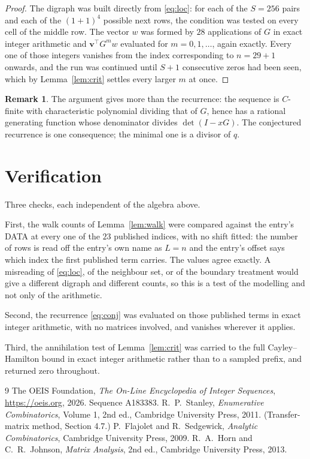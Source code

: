 \documentclass[11pt,a4paper]{article}
\theoremstyle{plain}
\theoremstyle{definition}
\newtheorem{remark}[theorem]{Remark}
\begin{document}
\begin{proof}
The digraph was built directly from \eqref{eq:loc}: for each of the $S=256$ pairs and each
of the $(1+1)^{4}$ possible next rows, the condition was tested on every cell of
the middle row. The vector $w$ was formed by $28$ applications of $G$ in exact integer
arithmetic and $\mathbf{v}^{\!\top}G^{m}w$ evaluated for $m=0,1,\dots$, again exactly.
Every one of those integers vanishes from the index corresponding to $n=29+1$ onwards,
and the run was continued until $S+1$ consecutive zeros had been seen, which by
Lemma~\ref{lem:crit} settles every larger $m$ at once.
\end{proof}

\begin{remark}
The argument gives more than the recurrence: the sequence is $C$-finite with characteristic
polynomial dividing that of $G$, hence has a rational generating function whose denominator
divides $\det(I-xG)$. The conjectured recurrence is one consequence; the minimal one is a
divisor of $q$.
\end{remark}

\section{Verification}

Three checks, each independent of the algebra above.

First, the walk counts of Lemma~\ref{lem:walk} were compared against the entry's DATA at
every one of the $23$ published indices, with no shift fitted: the number of rows is
read off the entry's own name as $L=n$ and the entry's offset says which index the first
published term carries. The values agree exactly. A misreading of \eqref{eq:loc}, of the
neighbour set, or of the boundary treatment would give a different digraph and different
counts, so this is a test of the modelling and not only of the arithmetic.

Second, the recurrence \eqref{eq:conj} was evaluated on those published terms in exact
integer arithmetic, with no matrices involved, and vanishes wherever it applies.

Third, the annihilation test of Lemma~\ref{lem:crit} was carried to the full
Cayley--Hamilton bound in exact integer arithmetic rather than to a sampled prefix, and
returned zero throughout.

\begin{thebibliography}{9}
 The OEIS Foundation, \emph{The On-Line Encyclopedia of Integer
Sequences}, \url{https://oeis.org}, 2026. Sequence A183383.
 R.~P.~Stanley, \emph{Enumerative Combinatorics}, Volume 1, 2nd ed.,
Cambridge University Press, 2011. (Transfer-matrix method, Section 4.7.)
 P.~Flajolet and R.~Sedgewick, \emph{Analytic Combinatorics}, Cambridge
University Press, 2009.
 R.~A.~Horn and C.~R.~Johnson, \emph{Matrix Analysis}, 2nd ed., Cambridge
University Press, 2013.
\end{thebibliography}
\end{document}
